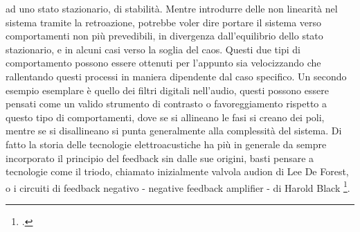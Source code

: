 ad uno stato stazionario, di stabilità.
Mentre introdurre delle non linearità nel sistema tramite la retroazione,
potrebbe voler dire portare il sistema verso comportamenti non più prevedibili,
in divergenza dall'equilibrio dello stato stazionario,
e in alcuni casi verso la soglia del caos.
Questi due tipi di comportamento possono essere ottenuti per l'appunto
sia velocizzando che rallentando questi processi
in maniera dipendente dal caso specifico.
Un secondo esempio esemplare è quello dei filtri digitali nell'audio,
questi possono essere pensati come un valido strumento
di contrasto o favoreggiamento rispetto a questo tipo di comportamenti,
dove se si allineano le fasi si creano dei poli,
mentre se si disallineano si punta generalmente alla complessità del sistema.
Di fatto la storia delle tecnologie elettroacustiche ha più in generale
da sempre incorporato il principio
del feedback sin dalle sue origini, basti pensare a tecnologie
come il triodo, chiamato inizialmente valvola audion di Lee De Forest,
o i circuiti di feedback negativo - negative feedback amplifier - di Harold Black
\footcite{echodiscipio}.
